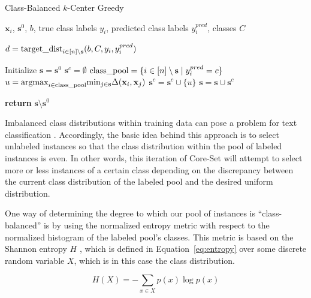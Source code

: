 \documentclass[english,bachelor,ul]{webisthesis} %
\begin{document}
\begin{algorithm}[htpb]
    \caption{Class-Balanced $k$-Center Greedy}%
\label{alg:classbalanced}
\begin{algorithmic}

\Require $ \mathbf{x}_i $, $ \mathbf{s}^0 $, $ b $, true class labels $ y_i $, predicted class labels $ y^{pred}_i $, classes $ C $

\State $ d = \text{target\textunderscore dist}_{i \in [n] \setminus \mathbf{s}} (b, C, y_i, y^{pred}_i) $

\State Initialize $ \mathbf{s} = \mathbf{s}^0 $
\State $ \mathbf{s}^c = \emptyset $
\State $ \text{class\textunderscore pool} = \{i \in [n] \setminus \mathbf{s} \; | \; y_i^{pred} = c\} $
\Repeat
\State $ u = \text{argmax}_{i \in \text{class\textunderscore pool}}\text{min}_{j \in \mathbf{s}} \Delta(\mathbf{x}_i, \mathbf{x}_j) $
\State $ \mathbf{s}^c = \mathbf{s}^c \cup \{u\} $
\State $ \mathbf{s} = \mathbf{s} \cup \mathbf{s}^c $
\EndFor

\State \textbf{return} $ \mathbf{s} \setminus \mathbf{s}^0 $
\end{algorithmic}
\end{algorithm}

Imbalanced class distributions within training data can pose a problem for text classification \citep{DBLP:conf/eacl/HenningBFF23}. Accordingly, the basic idea behind this approach is to select unlabeled instances so that the class distribution within the pool of labeled instances is even. In other words, this iteration of Core-Set will attempt to select more or less instances of a certain class depending on the discrepancy between the current class distribution of the labeled pool and the desired uniform distribution.

One way of determining the degree to which our pool of instances is ``class-balanced'' is by using the normalized entropy metric with respect to the normalized histogram of the labeled pool's classes. This metric is based on the Shannon entropy $ H $ \citep{DBLP:journals/bstj/Shannon48}, which is defined in Equation~\ref{eq:entropy} over some discrete random variable $ X $, which is in this case the class distribution.

\begin{equation}\label{eq:entropy}
    H(X) = -\sum_{x \in X} p(x) \log p(x)
\end{equation}
\end{document}
